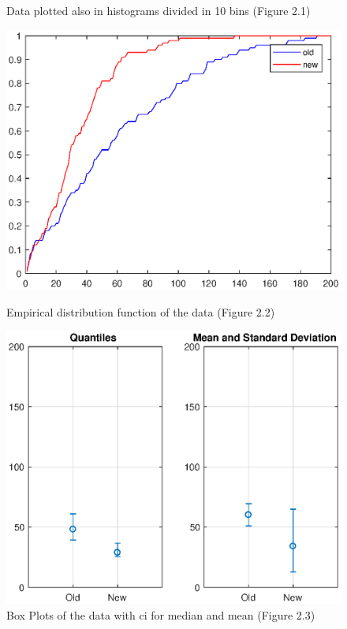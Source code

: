 \documentclass[11pt,a4paper]{article}
\begin{document}
\begin{figure}[ht]
\begin{minipage}{0.45\textwidth}
		\caption{Data plotted also in histograms divided in 10 bins (Figure 2.1)}
		\label{fig:data_exec_hist}
	\end{minipage}
\end{figure}

\begin{figure}[ht]
	\centering
	\begin{minipage}{0.45\textwidth}
		\centering
		\includegraphics[width=\textwidth]{ex1fig2_2}
		\caption{Empirical distribution function of the data (Figure 2.2) }
		\label{fig:edf_exec}
	\end{minipage}
	\begin{minipage}{0.45\textwidth}
		\centering
		\includegraphics[width=\textwidth]{ex1fig2_3}
		\caption{Box Plots of the data with \gls{ci} for median and mean (Figure 2.3)}
		\label{fig:box_plots_exec}
	\end{minipage}
\end{figure}
\end{document}
